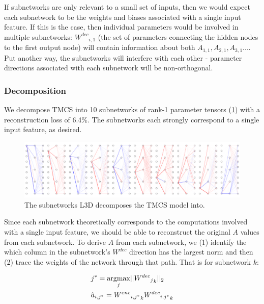 \documentclass{article}
\theoremstyle{plain}
\theoremstyle{definition}
\theoremstyle{remark}
\begin{document}
If subnetworks are only relevant to a small set of inputs, then we would expect each subnetwork to be the weights and biases associated with a single input feature. If this is the case, then individual parameters would be involved in multiple subnetworks: ${W^{dec}}_{i,1}$ (the set of parameters connecting the hidden nodes to the first output node) will contain information about both $A_{1,1}, A_{2,1}, A_{3,1}...$.  Put another way, the subnetworks will interfere with each other - parameter directions associated with each subnetwork will be non-orthogonal. 

\subsubsection{Decomposition}

We decompose TMCS into 10 subnetworks of rank-1 parameter tensors (\ref{fig:5_circuit_superposition_decomposition}) with a reconstruction loss of 6.4\%. The subnetworks each strongly correspond to a single input feature, as desired.


\begin{figure}[htbp]
    \centerline{\includegraphics[width=\textwidth]{../figures/5_circuit_superposition_decomposition.pdf}}
    \centering
    \caption{The subnetworks L3D decomposes the TMCS model into.}\label{fig:5_circuit_superposition_decomposition}
\end{figure}


Since each subnetwork theoretically corresponds to the computations involved with a single input feature, we should be able to reconstruct the original $A$ values from each subnetwork. To derive $A$ from each subnetwork, we (1) identify the which column in the subnetwork's $W^{dec}$ direction has the largest norm and then (2) trace the weights of the network through that path. That is for subnetwork $k$: 

\begin{align}
    &j^* = \underset{j}{\text{argmax}} ||{{{W^{dec}}_j}_k}||_2 \\
    &\hat{a}_{i,j^*} = {{{W^{enc}}_{i,j^*}}}_k {{W^{dec}}_{i,j^*}}_k \notag
\end{align}
\end{document}
